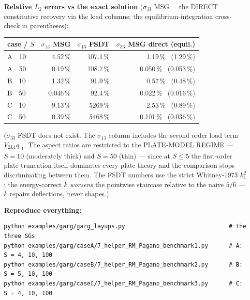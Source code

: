 \documentclass[11pt]{article}
\begin{document}
\textbf{Relative $L_2$ errors vs the exact solution} ($\sigma_{33}$ MSG = the DIRECT
constitutive recovery via the load columns; the equilibrium-integration cross-check in
parentheses):
\begin{center}\small
\begin{tabular}{lrrr}
\toprule
case / $S$ & $\sigma_{13}$ MSG & $\sigma_{13}$ FSDT & $\sigma_{33}$ MSG direct (equil.) \\
\midrule
A\ \ 10  &  4.52\,\% & 107.1\,\% & 1.19\,\% \ (1.29\,\%) \\
A\ \ 50  &  0.19\,\% & 108.7\,\% & 0.050\,\% \ (0.053\,\%) \\
B\ \ 10  &  1.32\,\% &  91.9\,\% & 0.57\,\% \ (0.48\,\%) \\
B\ \ 50  &  0.046\,\% &  92.4\,\% & 0.022\,\% \ (0.016\,\%) \\
C\ \ 10  &  9.13\,\% & 5269\,\% & 2.53\,\% \ (0.89\,\%) \\
C\ \ 50  &  0.39\,\% & 5468\,\% & 0.101\,\% \ (0.036\,\%) \\
\bottomrule
\end{tabular}
\end{center}
($\sigma_{33}$ FSDT does not exist.  The $\sigma_{13}$ column includes the second-order
load term $V_{2L1}q_{,1}$.  The aspect ratios are restricted to the PLATE-MODEL REGIME
--- $S = 10$ (moderately thick) and $S = 50$ (thin) --- since at $S \le 5$ the
first-order plate truncation itself dominates every plate theory and the comparison
stops discriminating between them.  The FSDT numbers use the strict Whitney-1973
$k_1^2$; the energy-correct $k$ \emph{worsens} the pointwise staircase relative to the
naive $5/6$ --- $k$ repairs deflections, never shapes.)

\textbf{Reproduce everything:}
\begin{verbatim}
python examples/garg/garg_layups.py                              # the three SGs
python examples/garg/caseA/7_helper_RM_Pagano_benchmark1.py      # A: S = 4, 10, 100
python examples/garg/caseB/7_helper_RM_Pagano_benchmark2.py      # B: S = 5, 10, 100
python examples/garg/caseC/7_helper_RM_Pagano_benchmark3.py      # C: S = 4, 10, 100
\end{verbatim}
\end{document}

